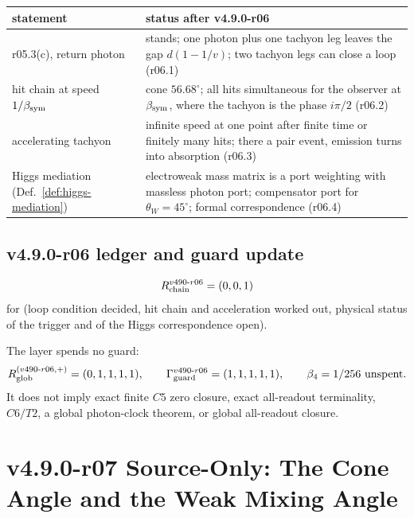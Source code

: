 \begin{center}
\small
\begin{tabular}{@{}>{\raggedright\arraybackslash}p{}>{\raggedright\arraybackslash}p{}@{}}
\toprule
statement & status after v4.9.0-r06\\
\midrule
r05.3(c), return photon & stands; one photon plus one tachyon leg leaves the gap \(d(1-1/v)\); two tachyon legs can close a loop (r06.1)\\
hit chain at speed \(1/\beta_{\mathrm{sym}}\) & cone \(56.68^\circ\); all hits simultaneous for the observer at \(\beta_{\mathrm{sym}}\), where the tachyon is the phase \(i\pi/2\) (r06.2)\\
accelerating tachyon & infinite speed at one point after finite time or finitely many hits; there a pair event, emission turns into absorption (r06.3)\\
Higgs mediation (Def.~\ref{def:higgs-mediation}) & electroweak mass matrix is a port weighting with massless photon port; compensator port for \(\theta_W=45^\circ\); formal correspondence (r06.4)\\
\bottomrule
\end{tabular}
\end{center}

\subsection*{v4.9.0-r06 ledger and guard update}
\label{subsec:v490-r06-ledger-guard}

\[
R_{\rm chain}^{v490\text{-}r06}=(0,0,1)
\]
for (loop condition decided, hit chain and acceleration worked out, physical status of the trigger and of the Higgs
correspondence open).

The layer spends no guard:
\[
R_{\rm glob}^{(v490\text{-}r06,+)}=(0,1,1,1,1),
\qquad
\Gamma_{\rm guard}^{v490\text{-}r06}=(1,1,1,1,1),
\qquad
\beta_4=1/256\ \text{unspent}.
\]
It does not imply exact finite \(C5\) zero closure, exact all-readout terminality,
\(C6/T2\), a global photon-clock theorem, or global all-readout closure.

\clearpage
\section*{v4.9.0-r07 Source-Only: The Cone Angle and the Weak Mixing Angle}
\label{sec:v490-r07-cone-weak-mixing}

